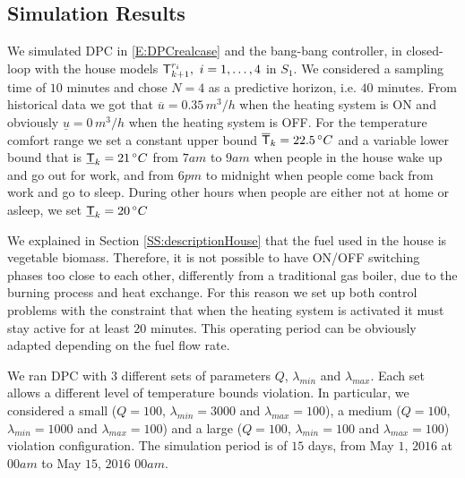 \subsection{Simulation Results}\label{SS:simulationResults} We simulated  DPC in \eqref{E:DPCrealcase} and the bang-bang controller, in closed-loop with the house models $\mathsf{T}^{r_i}_{k+1},\ i=1,\ldots,4$ in $S_1$. We considered a sampling time of $10$ minutes and chose $N=4$ as a predictive horizon, i.e. $40$ minutes. From historical data we got that $\overline{u} = 0.35 \, m^3/h$ when the heating system is ON and obviously $\underline{u} = 0 \, m^3/h$ when the heating system is OFF. For the temperature comfort range we set a constant upper bound $\overline{\mathsf{T}}_{k} = 22.5 \, \degree C$ and a variable lower bound that is $\underline{\mathsf{T}}_{k} = 21 \, \degree C$ from $7am$ to $9am$ when people in the house wake up and go out for work, and from $6pm$ to midnight when people come back from work and go to sleep. During other hours when people are either not at home or asleep, we set $\underline{\mathsf{T}}_{k} = 20 \, \degree C$ 

We explained in Section \ref{SS:descriptionHouse} that the fuel used in the house is vegetable biomass. Therefore, it is not possible to have ON/OFF switching phases too close to each other, differently from a traditional gas boiler, due to the burning process and heat exchange. For this reason we set up both control problems with the constraint that when the heating system is activated it must stay active for at least $20$ minutes. This operating period can be obviously adapted depending on the fuel flow rate.

We ran DPC with $3$ different sets of parameters $Q$, $\lambda_{min}$ and $\lambda_{max}$. Each set allows a different level of temperature bounds violation. In particular, we considered a small ($Q=100$, $\lambda_{min}=3000$ and $\lambda_{max}=100$), a medium ($Q=100$, $\lambda_{min}=1000$ and $\lambda_{max}=100$) and a large ($Q=100$, $\lambda_{min}=100$ and $\lambda_{max}=100$) violation configuration.
\textcolor[rgb]{0,0,1}{The simulation period is of $15$ days, from May $1$, $2016$ at $00am$ to May $15$, $2016$ $00am$.}

